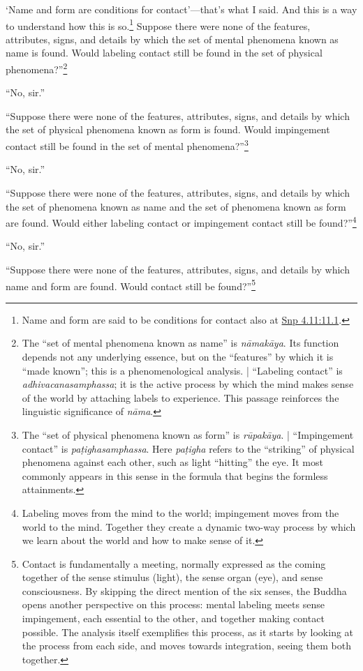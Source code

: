 \documentclass[12pt,openany]{book}%
\begin{document}
‘Name and form are conditions for contact’—that’s what I said. And this is a way to understand how this is so.\footnote{Name and form are said to be conditions for contact also at \href{https://suttacentral.net/snp4.11/en/sujato\#11.1}{Snp 4.11:11.1}. } Suppose there were none of the features, attributes, signs, and details by which the set of mental phenomena known as name is found. Would labeling contact still be found in the set of physical phenomena?”\footnote{The “set of mental phenomena known as name” is \textit{\textsanskrit{nāmakāya}}. Its function depends not any underlying essence, but on the “features” by which it is “made known”; this is a phenomenological analysis. | “Labeling contact” is \textit{adhivacanasamphassa}; it is the active process by which the mind makes sense of the world by attaching labels to experience. This passage reinforces the linguistic significance of \textit{\textsanskrit{nāma}}. } 

“No, sir.” 

“Suppose there were none of the features, attributes, signs, and details by which the set of physical phenomena known as form is found. Would impingement contact still be found in the set of mental phenomena?”\footnote{The “set of physical phenomena known as form” is \textit{\textsanskrit{rūpakāya}}. | “Impingement contact” is \textit{\textsanskrit{paṭighasamphassa}}. Here \textit{\textsanskrit{paṭigha}} refers to the “striking” of physical phenomena against each other, such as light “hitting” the eye. It most commonly appears in this sense in the formula that begins the formless attainments. } 

“No, sir.” 

“Suppose there were none of the features, attributes, signs, and details by which the set of phenomena known as name and the set of phenomena known as form are found. Would either labeling contact or impingement contact still be found?”\footnote{Labeling moves from the mind to the world; impingement moves from the world to the mind. Together they create a dynamic two-way process by which we learn about the world and how to make sense of it. } 

“No, sir.” 

“Suppose there were none of the features, attributes, signs, and details by which name and form are found. Would contact still be found?”\footnote{Contact is fundamentally a meeting, normally expressed as the coming together of the sense stimulus (light), the sense organ (eye), and sense consciousness. By skipping the direct mention of the six senses, the Buddha opens another perspective on this process: mental labeling meets sense impingement, each essential to the other, and together making contact possible. The analysis itself exemplifies this process, as it starts by looking at the process from each side, and moves towards integration, seeing them both together. } 
\end{document}
